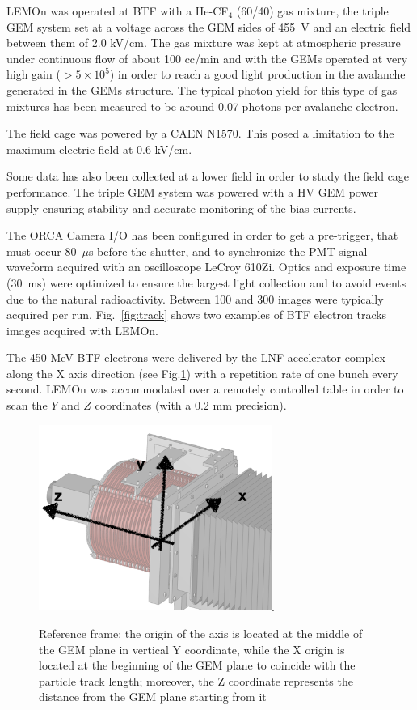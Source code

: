 \documentclass[%
 aip,
 amsmath,amssymb,
 reprint,%
]{revtex4-1}
\begin{document}
LEMOn was operated at BTF with a He-CF$_4$ (60/40) gas mixture, the triple GEM system set at a voltage across the GEM sides of 455~V and an electric field between them of 2.0 kV/cm. The gas mixture was kept at atmospheric pressure under continuous flow of about 100 cc/min and with the GEMs operated  at very high gain ($> 5\times10^5$) in order to reach a good light production in  the avalanche generated in the  GEMs structure. The typical photon yield for this  type of gas mixtures has been measured to be around  0.07 photons per avalanche electron.\cite{bib:jinst_orange1, bib:roby, bib:tesinatalia}

The field cage was powered by a CAEN N1570.\cite{CAENN1570} This posed a limitation to    the maximum  electric field  at 0.6 kV/cm. 

Some data has also been collected at a lower field in order to study the field cage performance. The triple GEM system was powered with a HV GEM power supply \cite{Corradi:2007df} ensuring stability and accurate monitoring of the bias currents.

The ORCA Camera I/O has been configured in order to get a pre-trigger, that must occur 80~$\mu$s before the shutter, and to synchronize the PMT signal waveform acquired with an oscilloscope LeCroy 610Zi. Optics and exposure time (30~ms) were optimized to ensure the largest light collection and to avoid events due to the natural radioactivity. Between 100 and 300 images were typically acquired per run. 
Fig.~\ref{fig:track} shows two examples of BTF electron tracks images acquired with LEMOn.

The 450 MeV  BTF  electrons were delivered by the LNF accelerator complex  along the X axis direction (see Fig.\ref{fig:frame})  with a repetition rate of one bunch every  second. LEMOn was accommodated over a remotely controlled table  in order to scan  the $Y$ and $Z$ coordinates (with a 0.2 mm precision). 

\begin{figure}[!ht]
\centering
\includegraphics[width=3in]{Fig4-referenceFrame.png}\DeclareGraphicsExtensions.
\caption{Reference frame: the origin of the axis is located at the middle of the GEM plane in vertical Y coordinate, while the X origin is located at the beginning of the GEM plane to coincide with the particle track length; moreover, the Z coordinate represents the distance from the GEM plane starting from it}
\label{fig:frame}
\end{figure}
\end{document}
